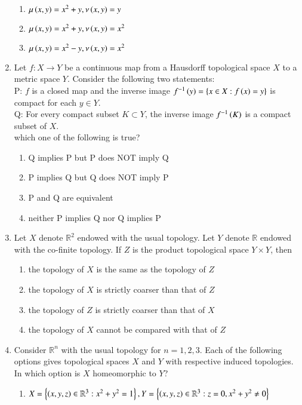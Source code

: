 \documentclass[journal]{IEEEtran}
\begin{document}
\begin{enumerate}
\begin{enumerate}
    \item $\mu\left(x,y\right)=x^2+y,\nu\left(x,y\right)=y$
    \item $\mu\left(x,y\right)=x^2+y,\nu\left(x,y\right)=x^2$
    \item $\mu\left(x,y\right)=x^2-y,\nu\left(x,y\right)=x^2$
\end{enumerate}
\item Let $f : X\rightarrow Y$ be a continuous map from a Hausdorff topological space $X$ to a metric space $Y$. Consider the following two statements:\\
  P: $f$ is a closed map and the inverse image $f^{-1}\left(y\right)=\left\{x\in X : f\left(x\right)=y\right\} $ is compact for each $y \in Y$.\\
  Q: For every compact subset $K \subset Y$, the inverse image $f^{-1}\left(K\right)$ is a compact subset of $X$.\\which one of the following is true?
  \begin{enumerate}
      \item Q implies P but P does NOT imply Q
      \item P implies Q but Q does NOT imply P
      \item P and Q are equivalent
      \item neither P implies Q nor Q implies P
  \end{enumerate}
\item Let $X$ denote $\mathbb{R}^2$ endowed with the usual topology. Let $Y$ denote $\mathbb{R}$ endowed with the co-finite topology. If $Z$ is the product topological space $Y\times Y$, then 
\begin{enumerate}
    \item the topology of $X$ is the same as the topology of $Z$
    \item the topology of $X$ is strictly coarser  than that of $Z$
    \item the topology of $Z$ is strictly coarser  than that of $X$
    \item the topology of $X$ cannot be compared with that of $Z$
\end{enumerate}
\item Consider $\mathbb{R}^n$ with the usual topology for $n=1,2,3$. Each of the following options gives topological spaces $X$ and $Y$ with respective induced topologies. In which option is $X$ homeomorphic to $Y$?
\begin{enumerate}
	\item $X=\left\{\left(x,y,z\right)\in \mathbb{R}^3 : x^2+y^2=1\right\},Y=\left\{\left(x,y,z\right)\in \mathbb{R}^3 : z=0, x^2+y^2 \neq 0\right\}$

\end{enumerate}
\end{enumerate}
\end{document}
